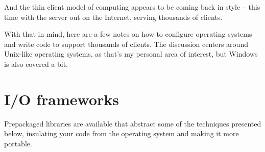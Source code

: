 \documentclass[twoside, xetex]{report}
\begin{document}
And the thin client model of computing appears to be coming back in style -- this time with the server out on the Internet, serving thousands of clients.

With that in mind, here are a few notes on how to configure operating systems and write code to support thousands of clients. The discussion centers around Unix-like operating systems, as that's my personal area of interest, but Windows is also covered a bit.

\section*{I/O frameworks}

Prepackaged libraries are available that abstract some of the techniques presented below, insulating your code from the operating system and making it more portable.
	
\end{document}
